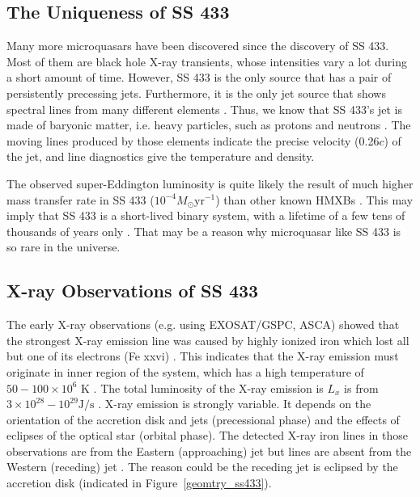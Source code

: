 \subsection{The Uniqueness of SS 433}
Many more microquasars have been discovered since the discovery of SS 433. Most of them are black hole X-ray transients, whose intensities vary a lot during a short amount of time. However, SS 433 is the only source that has a pair of persistently precessing jets. Furthermore, it is the only jet source that shows spectral lines from many different elements \citep{Margon1980}. Thus, we know that SS 433's jet is made of baryonic matter, i.e. heavy particles, such as protons and neutrons \citep{seward_charles_2010}. The moving lines produced by those elements indicate the precise velocity (0.26$c$) of the jet, and line diagnostics give the temperature and density.\par 

The observed super-Eddington luminosity is quite likely the result of much higher mass transfer rate in SS 433 ($10^{-4} M_{\odot} \mathrm{yr}^{-1}$) than other known HMXBs \citep{Van_den_heuvel1981}. This may imply that SS 433 is a short-lived binary system, with a lifetime of a few tens of thousands of years only \citep{seward_charles_2010}. That may be a reason why microquasar like SS 433 is so rare in the universe.




\subsection{X-ray Observations of SS 433}
The early X-ray observations (e.g. using EXOSAT/GSPC, ASCA) showed that the strongest X-ray emission line was caused by highly ionized iron which lost all but one of its electrons (Fe {\sc xxvi}) \citep{Watson1986}. This indicates that the X-ray emission must originate in inner region of the system, which has a high temperature of $50-100 \times 10^6$ K \citep{fabrika2004}. The total luminosity of the X-ray emission is $L_x$ is from $3 \times 10^{28} - 10^{29} \mathrm{J/s}$ \citep{fabrika2004}. X-ray emission is strongly variable. It depends on the orientation of the accretion disk and jets (precessional phase) and the effects of eclipses of the optical star (orbital phase). The detected X-ray iron lines in those observations are from the Eastern (approaching) jet but lines are absent from the Western (receding) jet \citep{fabrika2004}. The reason could be the receding jet is eclipsed by the accretion disk (indicated in Figure~\ref{geomtry_ss433}).\par


